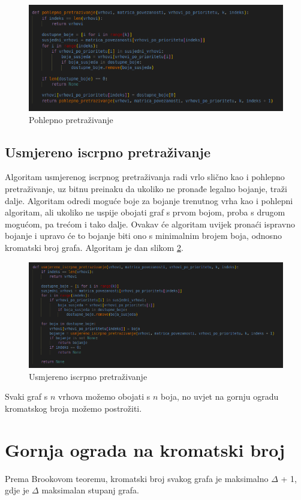 \documentclass[times, utf8, zavrsni]{fer}
\begin{document}
\begin{figure}[htb]
\centering
\includegraphics[width=12cm]{images/pohlepni_algoritam.png}
\caption{Pohlepno pretraživanje}
\label{fig:pohlepno pretrazivanje}
\end{figure}


\subsection{Usmjereno iscrpno pretraživanje}
Algoritam usmjerenog iscrpnog pretraživanja radi vrlo slično kao i pohlepno pretraživanje, uz bitnu preinaku da ukoliko ne pronađe legalno bojanje, traži dalje. Algoritam odredi moguće boje za bojanje trenutnog vrha kao i pohlepni algoritam, ali ukoliko ne uspije obojati graf s prvom bojom, proba s drugom mogućom, pa trećom i tako dalje. Ovakav će algoritam uvijek pronaći ispravno bojanje i upravo će to bojanje biti ono s minimalnim brojem boja, odnosno kromatski broj grafa. Algoritam je dan slikom \ref{fig:iscrpno usmjereno pretrazivanje}.

\begin{figure}[htb]
\centering
\includegraphics[width=12cm]{images/iscrpno_usmjereno_pretrazivanje.png}
\caption{Usmjereno iscrpno pretraživanje}
\label{fig:iscrpno usmjereno pretrazivanje}
\end{figure}

Svaki graf s $n$ vrhova možemo obojati s $n$ boja, no uvjet na gornju ogradu kromatskog broja možemo postrožiti.

\section{Gornja ograda na kromatski broj}
Prema Brookovom teoremu, kromatski broj svakog grafa je maksimalno $\Delta$ + 1, gdje je $\Delta$ maksimalan stupanj grafa. 
\end{document}
